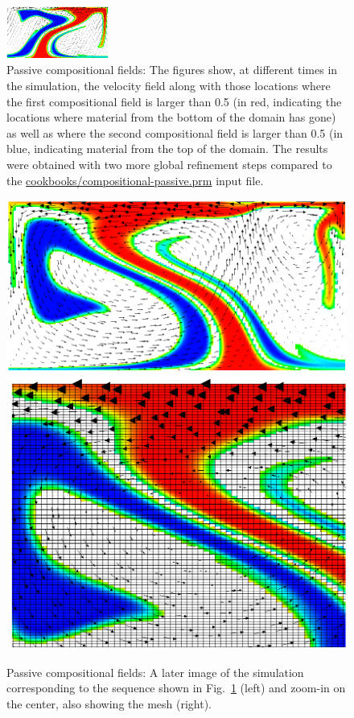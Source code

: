 \documentclass{article}
\begin{document}
\begin{figure}
  \hfill
  \includegraphics[width=0.3\textwidth]{cookbooks/composition-passive/visit0014.png}
  \caption{Passive compositional fields: The figures show, at
    different times in the simulation, the velocity field along with
    those locations where the first compositional field is larger than
    0.5 (in red, indicating the locations where material from the bottom
    of the domain has gone) as well as where the second compositional
    field is larger than 0.5 (in blue, indicating material from the top
    of the domain. The results were obtained with two more global
    refinement steps compared to the
    \url{cookbooks/compositional-passive.prm} input file.}
  \label{fig:compositional-passive}
\end{figure}

\begin{figure}
  \centering
  \includegraphics[height=0.3\textwidth]{cookbooks/composition-passive/visit0015.png}
  \hfill
  \includegraphics[height=0.3\textwidth]{cookbooks/composition-passive/visit0017.png}
  \caption{Passive compositional fields: A later image of the simulation
    corresponding to the sequence shown in
    Fig.~\ref{fig:compositional-passive} (left) and zoom-in on the
    center, also showing the mesh (right).}
  \label{fig:compositional-passive-zoom}
\end{figure}
\end{document}
